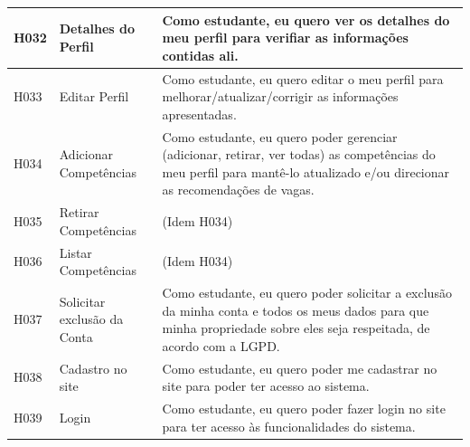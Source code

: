 \begin{quadro}[H]
\begin{tabular}{|l|p{4cm}|p{9cm}|}
		\hline
		H032 & Detalhes do Perfil & Como estudante, eu quero ver os detalhes do meu perfil para verifiar as informações contidas ali. \\
		\hline
		H033 & Editar Perfil & Como estudante, eu quero editar o meu perfil para melhorar/atualizar/corrigir as informações apresentadas. \\
		\hline
		H034 & Adicionar Competências & Como estudante, eu quero poder gerenciar (adicionar, retirar, ver todas) as competências do meu perfil para mantê-lo atualizado e/ou direcionar as recomendações de vagas. \\
		\hline
		H035 & Retirar Competências & (Idem H034) \\
		\hline
		H036 & Listar Competências & (Idem H034) \\
		\hline
		H037 & Solicitar exclusão da Conta & Como estudante, eu quero poder solicitar a exclusão da minha conta e todos os meus dados para que minha propriedade sobre eles seja respeitada, de acordo com a LGPD. \\
		\hline
		H038 & Cadastro no site & Como estudante, eu quero poder me cadastrar no site para poder ter acesso ao sistema. \\
		\hline
		H039 & Login & Como estudante, eu quero poder fazer login no site para ter acesso às funcionalidades do sistema. \\
		\hline
	\end{tabular}
\end{quadro}

